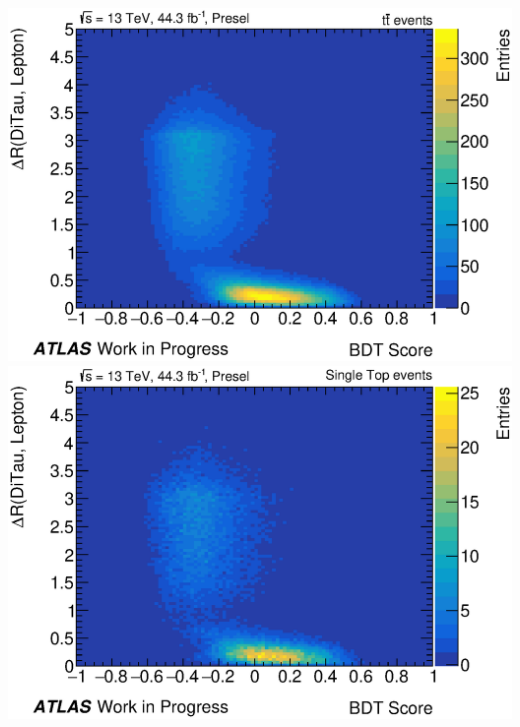 \begin{marginfigure}
    \noindent\includegraphics[width=0.99\linewidth]{Assets/Plots/Presel/h_mc16d_ttbar_ditau_bdt_lepton_dr.eps}\\

    \noindent\includegraphics[width=0.99\linewidth]{Assets/Plots/Presel/h_mc16d_SingleTop_ditau_bdt_lepton_dr.eps}\\


\end{marginfigure}
